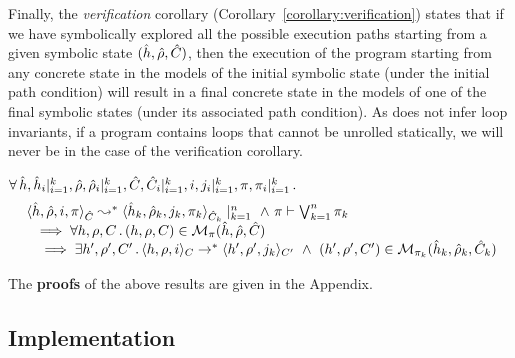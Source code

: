 %
Finally, the \emph{verification} corollary (Corollary~\ref{corollary:verification})
states that if we have symbolically explored all the possible execution paths
starting from a given symbolic state $(\hat{h}, \hat\rho, \hat{C})$,  
then the execution of the program starting from  any concrete state in the models 
of the initial symbolic state (under the initial path condition) will result in a final concrete state
in the models of one of the final symbolic states (under its associated path condition).  
As \jilette does not infer loop invariants, if a \jsil program contains loops that cannot be unrolled statically, we will never be in the case of the verification corollary. 

\begin{corollary}[Verification]\label{corollary:verification}
$\forall \, \hat{h}, \hat{h}_i|_{i=1}^k, \hat\rho, \hat\rho_i|_{i=1}^k, 
\hat{C}, \hat{C}_i|_{i=1}^k, i, j_i|_{i=1}^k, \pi, \pi_i|_{i=1}^k \, . \,$
\vspace{-0.25cm}
$$
\begin{array}{l}
  \ \symbtranstrans{\sheap, \sstore, i, \pc}{\sheap_k, \sstore_k, j_k, \pc_k}[\sctx][\sctx_k]\mid_{k = 1}^n
      \ \wedge \ \pc \vdash \bigvee_{k=1}^n \pc_k \\ 
      \quad \implies 
         \forall \heap, \store, \ctx \, . \, (\heap, \store, \ctx) \in \smodels{\sheap, \sstore, \sctx}{\pc} \\
          \ \quad \implies \exists \heap', \store', \ctx' \, . \, 
                  \semtranstrans{\heap, \store, i}{\heap', \store', j_k}[\ctx][\ctx'] \ \wedge \ 
                  (\heap', \store', \ctx') \in \smodels{\sheap_k, \sstore_k, \sctx_k}{\pc_k}
\end{array}   
$$ 
\end{corollary}
%
The {\bf proofs} of the above results are given in the Appendix. 


\subsection{Implementation}
\label{subsec:jsil:analysis:implementation}

